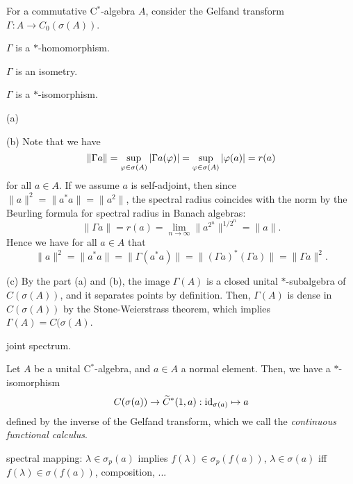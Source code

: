 \documentclass{../../large}
\begin{document}
\begin{prb}
For a commutative C$^*$-algebra $A$, consider the Gelfand transform $\Gamma:A\to C_0(\sigma(A))$.
\begin{parts}
\item $\Gamma$ is a $*$-homomorphism.
\item $\Gamma$ is an isometry.
\item $\Gamma$ is a $*$-isomorphism.
\end{parts}
\end{prb}
\begin{pf}
(a)

(b)
Note that we have
\[\|\Gamma a\|=\sup_{\varphi\in\sigma(A)}|\Gamma a(\varphi)|=\sup_{\varphi\in\sigma(A)}|\varphi(a)|=r(a)\]
for all $a\in A$.
If we assume $a$ is self-adjoint, then since $\|a\|^2=\|a^*a\|=\|a^2\|$, the spectral radius coincides with the norm by the Beurling formula for spectral radius in Banach algebras:
\[\|\Gamma a\|=r(a)=\lim_{n\to\infty}\|a^{2^n}\|^{1/2^n}=\|a\|.\]
Hence we have for all $a\in A$ that
\[\|a\|^2=\|a^*a\|=\|\Gamma(a^*a)\|=\|(\Gamma a)^*(\Gamma a)\|=\|\Gamma a\|^2.\]

(c)
By the part (a) and (b), the image $\Gamma(A)$ is a closed unital $*$-subalgebra of $C(\sigma(A))$, and it separates points by definition.
Then, $\Gamma(A)$ is dense in $C(\sigma(A))$ by the Stone-Weierstrass theorem, which implies $\Gamma(A)=C(\sigma(A)$.
\end{pf}



\begin{prb}
joint spectrum.
\end{prb}


\begin{prb}
Let $A$ be a unital C$^*$-algebra, and $a\in A$ a normal element.
Then, we have a $*$-isomorphism
\[C(\sigma(a))\to\widetilde C^*(1,a):\operatorname{id}_{\sigma(a)}\mapsto a\]
defined by the inverse of the Gelfand transform, which we call the \emph{continuous functional calculus}.

\begin{parts}
\item spectral mapping: $\lambda\in\sigma_p(a)$ implies $f(\lambda)\in\sigma_p(f(a))$, $\lambda\in\sigma(a)$ iff $f(\lambda)\in\sigma(f(a))$, composition, ...
\end{parts}
\end{prb}
\end{document}
